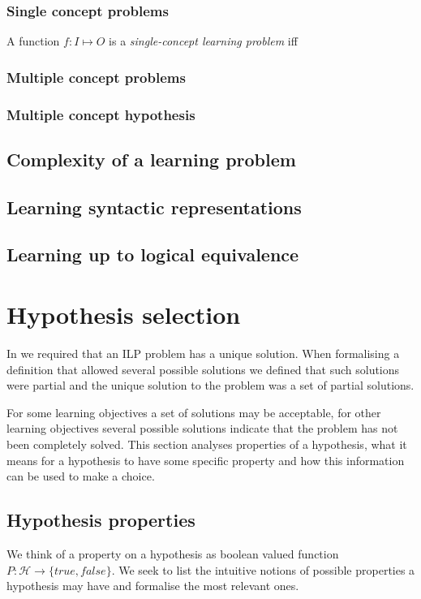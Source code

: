 \subsubsection{Single concept problems}
\begin{defn}
A function $f:I \mapsto O$ is a \emph{single-concept learning problem}
iff 
\end{defn}

\subsubsection{Multiple concept problems}

\subsubsection{Multiple concept hypothesis}

\subsection{Complexity of a learning problem}
\subsection{Learning syntactic representations}
\subsection{Learning up to logical equivalence}

\section{Hypothesis selection}
In  we required that an ILP problem has a unique solution. When formalising a definition that allowed several possible solutions we defined that such solutions were partial and the unique solution to the problem was a set of partial solutions.

For some learning objectives a set of solutions may be acceptable, for other learning objectives several possible solutions indicate that the problem has not been completely solved. This section analyses properties of a hypothesis, what it means for a hypothesis to have some specific property and how this information can be used to make a choice.

\subsection{Hypothesis properties}
We think of a property on a hypothesis as boolean valued function
$P:\mathcal{H} \to \{true, false\}$. We seek to list the intuitive notions of possible properties a hypothesis may have and formalise the most relevant ones.

